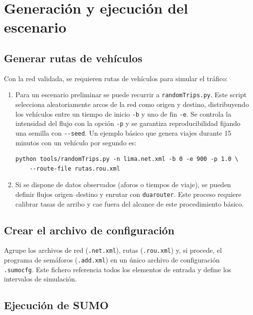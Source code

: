 \section{Generación y ejecución del escenario}

\subsection{Generar rutas de vehículos}

Con la red validada, se requieren rutas de vehículos para simular el
tráfico:

\begin{enumerate}
  \item Para un escenario preliminar se puede recurrir a
    \verb|randomTrips.py|.  Este script selecciona aleatoriamente
    arcos de la red como origen y destino, distribuyendo los vehículos
    entre un tiempo de inicio \verb|-b| y uno de fin \verb|-e|.
    Se controla la intensidad del flujo con la opción \verb|-p| y se
    garantiza reproducibilidad fijando una semilla con \verb|--seed|.
    Un ejemplo básico que genera viajes durante 15 minutos con un
    vehículo por segundo es:

    \begin{verbatim}
python tools/randomTrips.py -n lima.net.xml -b 0 -e 900 -p 1.0 \
    --route-file rutas.rou.xml
    \end{verbatim}

  \item Si se dispone de datos observados (aforos o tiempos de viaje),
    se pueden definir flujos origen–destino y enrutar con
    \verb|duarouter|.  Este proceso requiere calibrar tasas de arribo
    y cae fuera del alcance de este procedimiento básico.
\end{enumerate}

\subsection{Crear el archivo de configuración}

Agrupe los archivos de red (\texttt{.net.xml}), rutas
(\texttt{.rou.xml}) y, si procede, el programa de semáforos
(\texttt{.add.xml}) en un único archivo de configuración
\texttt{.sumocfg}.  Este fichero referencia todos los elementos de
entrada y define los intervalos de simulación.

\subsection{Ejecución de SUMO}

